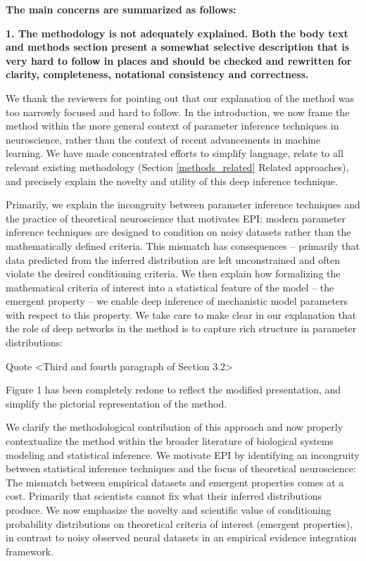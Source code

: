 \documentclass[11pt,a4paper]{article}
\begin{document}
\textbf{The main concerns are summarized as follows:}

\textbf{1. The methodology is not adequately explained. Both the body text and methods section present a somewhat selective description that is very hard to follow in places and should be checked and rewritten for clarity, completeness, notational consistency and correctness.}

We thank the reviewers for pointing out that our explanation of the method was too narrowly focused and hard to follow. In the introduction, we now frame the method within the more general context of parameter inference techniques in neuroscience, rather than the context of recent advancements in machine learning.  We have made concentrated efforts to simplify language, relate to all relevant existing methodology (Section \ref{methods_related} Related approaches), and precisely explain the novelty and utility of this deep inference technique.
 
Primarily, we explain the incongruity between parameter inference techniques and the practice of theoretical neuroscience that motivates EPI: modern parameter inference techniques are designed to condition on noisy datasets rather than the mathematically defined criteria.  This mismatch has consequences – primarily that data predicted from the inferred distribution are left unconstrained and often violate the desired conditioning criteria.  We then explain how formalizing the mathematical criteria of interest into a statistical feature of the model – the emergent property – we enable deep inference of mechanistic model parameters with respect to this property.  We take care to make clear in our explanation that the role of deep networks in the method is to capture rich structure in parameter distributions:

Quote <Third and fourth paragraph of Section 3.2>

Figure 1 has been completely redone to reflect the modified presentation, and simplify the pictorial representation of the method.

We clarify the methodological contribution of this approach and now properly contextualize the method within the broader literature of biological systems modeling and statistical inference.
We motivate EPI by identifying an incongruity between statistical inference techniques and the focus of theoretical neuroscience:
The mismatch between empirical datasets and emergent properties comes at a cost.  Primarily that scientists cannot fix what their inferred distributions produce.  We now emphasize the novelty and scientific value of conditioning probability distributions on theoretical criteria of interest (emergent properties), in contrast to noisy observed neural datasets in an empirical evidence integration framework.  
\end{document}
